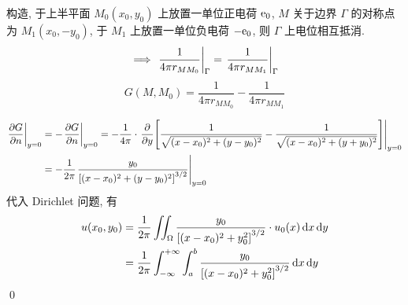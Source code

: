 \begin{solution}
构造, 于上半平面 $M_0(x_0, y_0)$ 上放置一单位正电荷 ${\mathrm e}_0$, $M$ 关于边界
$\Gamma$ 的对称点为 $M_1(x_0, -y_0)$, 于 $M_1$ 上放置一单位负电荷 $-{\mathrm e}_0$,
则 $\Gamma$ 上电位相互抵消.
\[ \implies {\left.{\frac 1{4\pi r_{MM_0}}} \right|}_{\Gamma} =
{\left.{\frac 1{4\pi r_{MM_1}}} \right|}_{\Gamma} \]
\[ G(M, M_0) = \frac 1{4\pi r_{MM_0}} - \frac 1{4\pi r_{MM_1}} \]

\[ \begin{aligned}
{\left.{{\frac{\partial {G}}{\partial {n}}}} \right|}_{y=0} &= -{\left.{{\frac{\partial {G}}{\partial {n}}}} \right|}_{y=0}
= -\frac 1{4\pi} \cdot {\left.{{{\frac{\partial {}}{\partial {y}}}} {\left[ {
\frac 1{\sqrt{(x-x_0)^2 + (y-y_0)^2}} - \frac 1{\sqrt{(x-x_0)^2 + (y+y_0)^2}}
} \right]}} \right|}_{y=0} \\
&= -\frac 1{2\pi} {\left.{\frac{y_0}{{\left[ {
    (x-x_0)^2+(y-y_0)^2
} \right]}^{3/2}}} \right|}_{y=0}
\end{aligned} \]
代入 Dirichlet 问题, 有
\[ \begin{aligned}
u(x_0, y_0) &= \frac 1{2\pi} \iint_\Omega \frac{y_0}{{\left[ {
    (x-x_0)^2+y_0^2
} \right]}^{3/2}} \cdot u_0(x) \operatorname{d\!} x \operatorname{d\!} y \\
&= \frac 1{2\pi} \int_{-\infty}^{+\infty} \int_a^b \frac{y_0}{{\left[ {
    (x-x_0)^2+y_0^2
} \right]}^{3/2}}  \operatorname{d\!} x \operatorname{d\!} y \\
\end{aligned} \]
\qed
\end{solution}


\endinput
